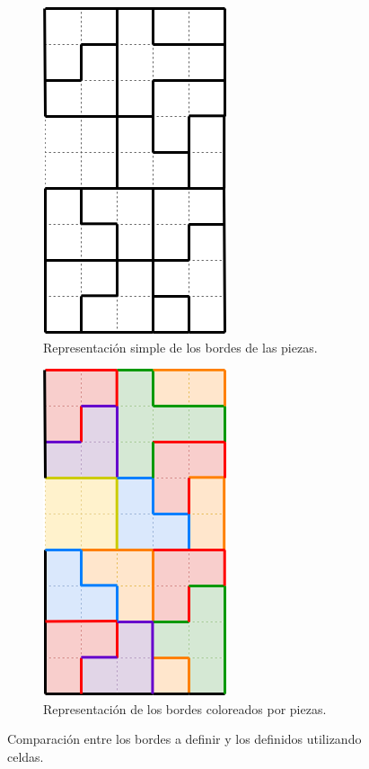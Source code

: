 \begin{figure}[H]
    \centering
        \begin{subfigure}[b]{0.45\textwidth}
            \centering
            \includegraphics[scale=0.65]{img/grafo.png}
            \caption{Representación simple de los bordes de las piezas.}
        \end{subfigure}
        \hfill
        \begin{subfigure}[b]{0.45\textwidth}
            \centering
            \includegraphics[scale=0.65]{img/grafo_color.png}
            \caption{Representación de los bordes coloreados por piezas.}
        \end{subfigure}
        \caption{Comparación entre los bordes a definir y los definidos utilizando celdas.}
        \label{fig:representacionColor}
\end{figure}


